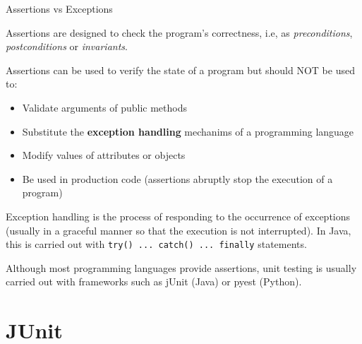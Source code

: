 \documentclass[11pt, xcolor=svgnames]{beamer}
\begin{document}
\begin{frame}[fragile]{Assertions vs Exceptions}

Assertions are designed to check the program's correctness, i.e, as \emph{preconditions}, \emph{postconditions} or \emph{invariants}.

Assertions can be used to verify the state of a program but should NOT be used to:

\begin{itemize}
\item Validate arguments of public methods
\item Substitute the \textbf{exception handling} mechanims of a programming language
\item Modify values of attributes or objects
\item Be used in production code (assertions abruptly stop the execution of a program)
\end{itemize}

Exception handling is the process of responding to the occurrence of exceptions (usually in a graceful manner so that the execution is not interrupted). In Java, this is carried out with \texttt{try() ... catch() ... finally} statements.

Although most programming languages provide assertions, unit testing is usually carried out with frameworks such as jUnit (Java) or pyest (Python). 

\end{frame}



\section{JUnit}

\end{document}
